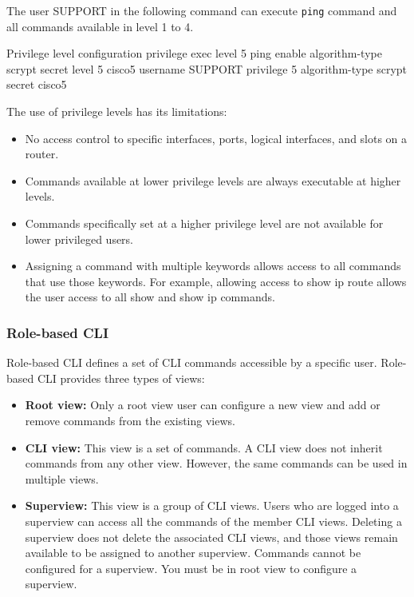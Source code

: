 The user SUPPORT in the following command can execute \texttt{ping} command and all commands available in level 1 to 4. 

\begin{sexylisting}{Privilege level configuration}
privilege exec level 5 ping 
enable algorithm-type scrypt secret level 5 cisco5
username SUPPORT privilege 5 algorithm-type scrypt secret cisco5
\end{sexylisting}

The use of privilege levels has its limitations:

\begin{itemize}
\item No access control to specific interfaces, ports, logical interfaces, and slots on a router.
\item Commands available at lower privilege levels are always executable at higher levels.
\item Commands specifically set at a higher privilege level are not available for lower privileged users.
\item Assigning a command with multiple keywords allows access to all commands that use those keywords. For example, allowing access to show ip route allows the user access to all show and show ip commands.
\end{itemize}

\subsubsection{Role-based CLI}

Role-based CLI defines a set of CLI commands accessible by a specific user. Role-based CLI provides three types of views:

\begin{itemize}
\item \textbf{Root view:} Only a root view user can configure a new view and add or remove commands from the existing views.
\item \textbf{CLI view:} This view is a set of commands.  A CLI view does not inherit commands from any other view. However, the same commands can be used in multiple views.
\item \textbf{Superview:} This view is a group of CLI views. Users who are logged into a superview can access all the commands of the member CLI views. Deleting a superview does not delete the associated CLI views, and those views remain available to be assigned to another superview. Commands cannot be configured for a superview. You must be in root view to configure a superview.
\end{itemize}

